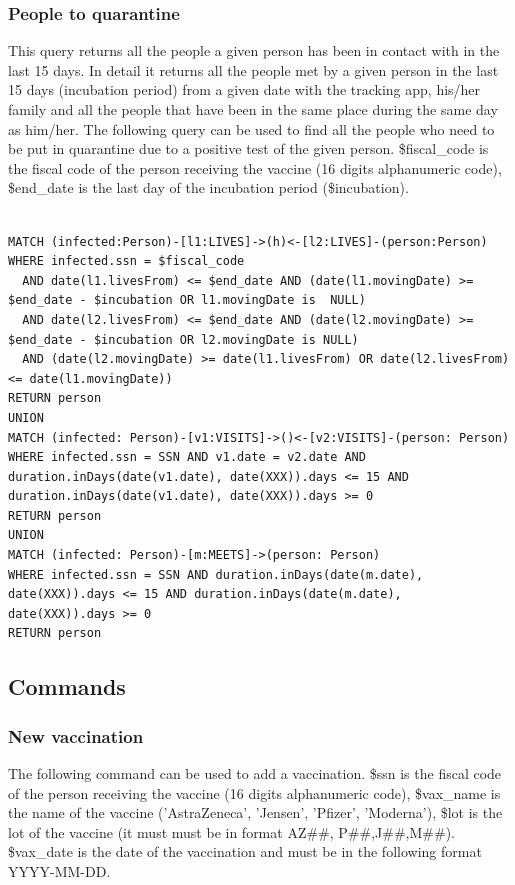 \documentclass{article}
\begin{document}
\subsubsection{People to quarantine}
This query returns all the people a given person has been in contact with in the last 15 days. In detail it returns all the people met by a given person in the last 15 days (incubation period) from a given date with the tracking app, his/her family and all the people that have been in the same place during the same day as him/her.
The following query can be used to find all the people who need to be put in quarantine due to a positive test of the given person.
\$fiscal\_code is the fiscal code of the person receiving the vaccine (16 digits alphanumeric code), \$end\_date is the last day of the incubation period (\$incubation).

\begin{lstlisting}[language=cypher, label=lst:cypher-example]

MATCH (infected:Person)-[l1:LIVES]->(h)<-[l2:LIVES]-(person:Person)
WHERE infected.ssn = $fiscal_code
  AND date(l1.livesFrom) <= $end_date AND (date(l1.movingDate) >= $end_date - $incubation OR l1.movingDate is  NULL)
  AND date(l2.livesFrom) <= $end_date AND (date(l2.movingDate) >= $end_date - $incubation OR l2.movingDate is NULL)
  AND (date(l2.movingDate) >= date(l1.livesFrom) OR date(l2.livesFrom) <= date(l1.movingDate))
RETURN person
UNION
MATCH (infected: Person)-[v1:VISITS]->()<-[v2:VISITS]-(person: Person)
WHERE infected.ssn = SSN AND v1.date = v2.date AND duration.inDays(date(v1.date), date(XXX)).days <= 15 AND duration.inDays(date(v1.date), date(XXX)).days >= 0
RETURN person
UNION
MATCH (infected: Person)-[m:MEETS]->(person: Person)
WHERE infected.ssn = SSN AND duration.inDays(date(m.date), date(XXX)).days <= 15 AND duration.inDays(date(m.date), date(XXX)).days >= 0
RETURN person
\end{lstlisting}

\subsection{Commands}
\subsubsection{New vaccination}
The following command can be used to add a vaccination. \$ssn is the fiscal code of the person receiving the vaccine (16 digits alphanumeric code), \$vax\_name is the name of the vaccine ('AstraZeneca', 'Jensen', 'Pfizer', 'Moderna'), \$lot is the lot of the vaccine (it must must be in format AZ\#\#, P\#\#,J\#\#,M\#\#). \$vax\_date is the date of the vaccination and must be in the following format YYYY-MM-DD.
\end{document}
